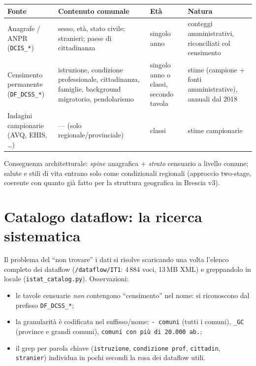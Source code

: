 \documentclass[11pt,a4paper]{article}
\newcommand{\code}[1]{\texttt{#1}}
\newcommand{\flow}[1]{\texttt{\small #1}}
\begin{document}
\begin{center}
\begin{tabular}{@{}p{3.1cm}p{4.6cm}p{2.6cm}p{3.6cm}@{}}
\toprule
\textbf{Fonte} & \textbf{Contenuto comunale} & \textbf{Et\`a} & \textbf{Natura}\\
\midrule
Anagrafe / ANPR (\flow{DCIS\_*}) & sesso, et\`a, stato civile; stranieri; paese di cittadinanza & singolo anno & conteggi amministrativi, riconciliati col censimento\\
\addlinespace
Censimento permanente (\flow{DF\_DCSS\_*}) & istruzione, condizione professionale, cittadinanza, famiglie, background migratorio, pendolarismo & singolo anno o classi, secondo tavola & stime (campione + fonti amministrative), annuali dal 2018\\
\addlinespace
Indagini campionarie (AVQ, EHIS, \dots) & --- (solo regionale/provinciale) & classi & stime campionarie\\
\bottomrule
\end{tabular}
\end{center}

\noindent
Conseguenza architetturale: \emph{spine} anagrafica + \emph{strato} censuario a
livello comune; salute e stili di vita entrano solo come condizionali regionali
(approccio two-stage, coerente con quanto gi\`a fatto per la struttura geografica
in Brescia v3).

\section{Catalogo dataflow: la ricerca sistematica}
Il problema del ``non trovare'' i dati si risolve scaricando una volta l'elenco
completo dei dataflow (\code{/dataflow/IT1}: 4\,884 voci, 13\,MB XML) e
greppandolo in locale (\code{istat\_catalog.py}). Osservazioni:
\begin{itemize}[leftmargin=*]
  \item le tavole censuarie \emph{non} contengono ``censimento'' nel nome: si
  riconoscono dal prefisso \flow{DF\_DCSS\_*};
  \item la granularit\`a \`e codificata nel suffisso/nome: \flow{- comuni}
  (tutti i comuni), \flow{\_GC} (province e grandi comuni), \flow{comuni con pi\`u
  di 20.000 ab.};
  \item il grep per parola chiave (\code{istruzione}, \code{condizione prof},
  \code{cittadin}, \code{stranier}) individua in pochi secondi la rosa dei
  dataflow utili.
\end{itemize}
\end{document}
